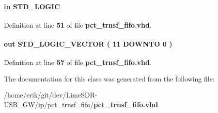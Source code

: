 \paragraph[{wrreq}]{ {\bfseries \textcolor{keywordflow}{in}\textcolor{vhdlchar}{ }} {\bfseries \textcolor{comment}{S\+T\+D\+\_\+\+L\+O\+G\+IC}\textcolor{vhdlchar}{ }} \hspace{0.3cm}{\ttfamily [Port]}}\label{classpct__trnsf__fifo_ae7e02414aa516307988efa17ff21d58c}


Definition at line {\bf 51} of file {\bf pct\+\_\+trnsf\+\_\+fifo.\+vhd}.

\paragraph[{wrusedw}]{ {\bfseries \textcolor{keywordflow}{out}\textcolor{vhdlchar}{ }} {\bfseries \textcolor{comment}{S\+T\+D\+\_\+\+L\+O\+G\+I\+C\+\_\+\+V\+E\+C\+T\+OR}\textcolor{vhdlchar}{ }\textcolor{vhdlchar}{(}\textcolor{vhdlchar}{ }\textcolor{vhdlchar}{ } \textcolor{vhdldigit}{11} \textcolor{vhdlchar}{ }\textcolor{keywordflow}{D\+O\+W\+N\+TO}\textcolor{vhdlchar}{ }\textcolor{vhdlchar}{ } \textcolor{vhdldigit}{0} \textcolor{vhdlchar}{ }\textcolor{vhdlchar}{)}\textcolor{vhdlchar}{ }} \hspace{0.3cm}{\ttfamily [Port]}}\label{classpct__trnsf__fifo_af84a0fa572fa95d68e4b362778d80e49}


Definition at line {\bf 57} of file {\bf pct\+\_\+trnsf\+\_\+fifo.\+vhd}.



The documentation for this class was generated from the following file\+:\begin{DoxyCompactItemize}
\item 
/home/erik/git/dev/\+Lime\+S\+D\+R-\/\+U\+S\+B\+\_\+\+G\+W/ip/pct\+\_\+trnsf\+\_\+fifo/{\bf pct\+\_\+trnsf\+\_\+fifo.\+vhd}\end{DoxyCompactItemize}
